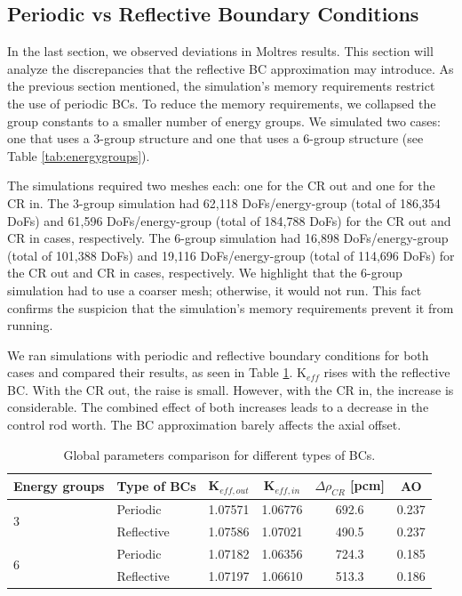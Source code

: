 \subsection{Periodic vs Reflective Boundary Conditions}
\label{sec:bench-bcs}

In the last section, we observed deviations in Moltres results.
This section will analyze the discrepancies that the reflective \gls{BC} approximation may introduce.
As the previous section mentioned, the simulation's memory requirements restrict the use of periodic BCs.
To reduce the memory requirements, we collapsed the group constants to a smaller number of energy groups.
We simulated two cases: one that uses a 3-group structure and one that uses a 6-group structure (see Table \ref{tab:energygroups}).

The simulations required two meshes each: one for the CR out and one for the CR in.
The 3-group simulation had 62,118 DoFs/energy-group (total of 186,354 DoFs) and 61,596 DoFs/energy-group (total of 184,788 DoFs) for the CR out and CR in cases, respectively.
The 6-group simulation had 16,898 DoFs/energy-group (total of 101,388 DoFs) and 19,116 DoFs/energy-group (total of 114,696 DoFs) for the CR out and CR in cases, respectively.
We highlight that the 6-group simulation had to use a coarser mesh; otherwise, it would not run.
This fact confirms the suspicion that the simulation's memory requirements prevent it from running.

We ran simulations with periodic and reflective boundary conditions for both cases and compared their results, as seen in Table \ref{tab:benchmark-bc}.
K$_{eff}$ rises with the reflective BC.
With the CR out, the raise is small.
However, with the CR in, the increase is considerable.
The combined effect of both increases leads to a decrease in the control rod worth.
The BC approximation barely affects the axial offset.

\begin{table}[htbp!]
  \centering
  \caption{Global parameters comparison for different types of BCs.}
  \begin{tabular}{llcccc}
  \toprule
  Energy groups       & Type of BCs & K$_{eff, out}$ & K$_{eff, in}$ & $\Delta \rho_{CR}$ [pcm] & AO \\
  \midrule
  \multirow{2}{*}{3}  & Periodic     & 1.07571		& 1.06776		& 692.6		& 0.237		\\
                      & Reflective   & 1.07586	  & 1.07021   & 490.5		& 0.237	  \\ \hline
  \multirow{2}{*}{6}  & Periodic     & 1.07182		& 1.06356		& 724.3	  & 0.185  	\\
                      & Reflective   & 1.07197   	& 1.06610 	& 513.3		& 0.186		\\  
  \bottomrule
  \end{tabular}
  \label{tab:benchmark-bc}
\end{table}

